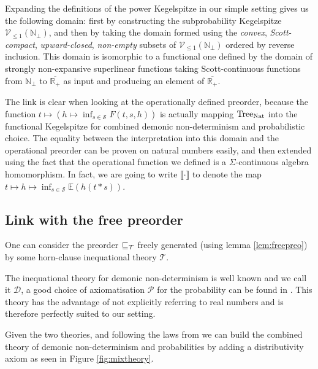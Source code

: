 Expanding the definitions of the power Kegelspitze in our 
simple setting \cite{KeimelP2016} gives us the following domain: 
first by constructing the subprobability Kegelspitze
$\mathcal{V}_{\leq 1}(\mathbb{N}_\bot)$, and then by taking the domain 
formed using the \emph{convex}, \emph{Scott-compact}, \emph{upward-closed}, \emph{non-empty}
subsets of $\mathcal{V}_{\leq 1}(\mathbb{N}_\bot)$ ordered by reverse inclusion.
This domain is isomorphic to a functional one \cite{KeimelP2016} defined by 
the domain of strongly non-expansive superlinear functions taking 
Scott-continuous functions from $\mathbb{N}_\bot$ to $\overline{\mathbb{R}_+}$
as input and producing an element of $\overline{\mathbb{R}_+}$.

The link is clear when looking at the operationally defined preorder,
because the function $t \mapsto (h \mapsto \inf_{s \in \mathcal{S}} F(t,s,h))$
is actually mapping $\textnormal{Tree}_{\textnormal{Nat}}$ into the functional Kegelspitze for 
combined demonic non-determinism and probabilistic choice. The equality between 
the interpretation into this domain and the operational preorder 
can be proven on natural numbers easily, and then extended using the fact that 
the operational function we defined is a $\Sigma$-continuous algebra
homomorphism.
In fact, we are going to write $\llbracket \cdot \rrbracket$
to denote the map $t \mapsto h \mapsto \inf_{s \in \mathcal{S}} \mathbb{E}(h
(t*s))$.


\subsection{Link with the free preorder}

One can consider the preorder $\sqsubseteq_\mathcal{T}$
freely generated (using lemma \ref{lem:freepreo}) 
by some horn-clause inequational theory $\mathcal{T}$.

The inequational theory for demonic non-determinism
is well known and we call it $\mathcal{D}$, 
a good choice of axiomatisation $\mathcal{P}$ for the probability 
can be found in \cite{heckmann1994probabilistic}.
This theory has the advantage of not explicitly referring  
to real numbers and is therefore perfectly suited to 
our setting.

Given the two theories, and following the laws from 
\cite{KeimelP2016} we can build the combined theory
of demonic non-determinism and probabilities by adding 
a distributivity axiom as seen 
in Figure \ref{fig:mixtheory}.

